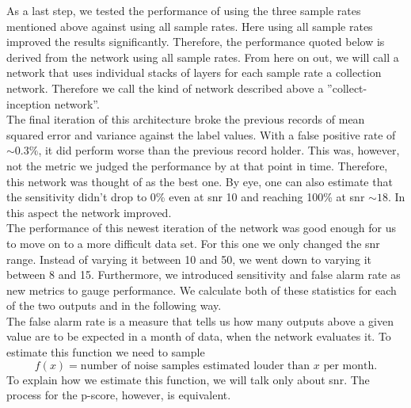 As a last step, we tested the performance of using the three sample rates mentioned above against using all sample rates. Here using all sample rates improved the results significantly. Therefore, the performance quoted below is derived from the network using all sample rates.
 From here on out, we will call a network that uses individual stacks of layers for each sample rate a collection network. Therefore we call the kind of network described above a ''collect-inception network''.\\
The final iteration of this architecture broke the previous records of mean squared error and variance against the label values. With a false positive rate of $\sim 0.3\%$, it did perform worse than the previous record holder. This was, however, not the metric we judged the performance by at that point in time. Therefore, this network was thought of as the best one. By eye, one can also estimate that the sensitivity didn't drop to 0\% even at \gls{snr} 10 and reaching 100\% at \gls{snr} $\sim 18$. In this aspect the network improved.\medskip\\
The performance of this newest iteration of the network was good enough for us to move on to a more difficult data set. For this one we only changed the \gls{snr} range. Instead of varying it between 10 and 50, we went down to varying it between 8 and 15. Furthermore, we introduced sensitivity and false alarm rate as new metrics to gauge performance. We calculate both of these statistics for each of the two outputs and in the following way.\\
The false alarm rate is a measure that tells us how many outputs above a given value are to be expected in a month of data, when the network evaluates it. To estimate this function we need to sample
\begin{equation}\label{def:false_alarm_rate}
f(x)=\text{number of noise samples estimated louder than }x\text{ per month}.
\end{equation}
To explain how we estimate this function, we will talk only about \gls{snr}. The process for the p-score, however, is equivalent.\\

